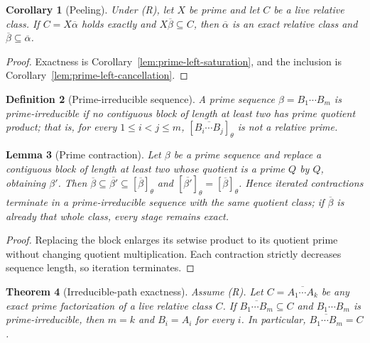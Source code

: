 \documentclass[11pt,a4paper]{article}
\newtheorem{theorem}{Theorem}[section]
\newtheorem{lemma}[theorem]{Lemma}
\newtheorem{corollary}[theorem]{Corollary}
\newtheorem{definition}[theorem]{Definition}
\begin{document}
\begin{corollary}[Peeling]
\label{cor:peeling}
Under \textup{(R)}, let $X$ be prime and let $C$ be a live relative class.  If $C=X\overline\alpha$ holds exactly and $X\overline\beta\subseteq C$, then $\overline\alpha$ is an exact relative class and $\overline\beta\subseteq\overline\alpha$.
\end{corollary}

\begin{proof}
Exactness is Corollary~\ref{lem:prime-left-saturation}, and the inclusion is Corollary~\ref{lem:prime-left-cancellation}.
\end{proof}

\begin{definition}[Prime-irreducible sequence]
A prime sequence $\beta=B_1\cdots B_m$ is \emph{prime-irreducible} if
no contiguous block of length at least two has prime quotient product;
that is, for every $1\le i<j\le m$,
$[\overline{B_i\cdots B_j}]_\theta$ is not a relative prime.
\end{definition}

\begin{lemma}[Prime contraction]
\label{lem:prime-contraction}
Let $\beta$ be a prime sequence and replace a contiguous block of length at least two whose quotient is a prime $Q$ by $Q$, obtaining $\beta'$.  Then $\overline\beta\subseteq\overline{\beta'}\subseteq[\overline\beta]_\theta$ and $[\overline{\beta'}]_\theta=[\overline\beta]_\theta$.  Hence iterated contractions terminate in a prime-irreducible sequence with the same quotient class; if $\overline\beta$ is already that whole class, every stage remains exact.
\end{lemma}

\begin{proof}
Replacing the block enlarges its setwise product to its quotient prime without changing quotient multiplication.  Each contraction strictly decreases sequence length, so iteration terminates.
\end{proof}

\begin{theorem}[Irreducible-path exactness]
\label{thm:irreducible-path}
Assume \textup{(R)}.  Let \(C=\overline{A_1\cdots A_k}\) be any exact prime
factorization of a live relative class $C$.  If
$\overline{B_1\cdots B_m}\subseteq C$ and $B_1\cdots B_m$ is
prime-irreducible, then $m=k$ and $B_i=A_i$ for every $i$.  In
particular, $\overline{B_1\cdots B_m}=C$.
\end{theorem}
\end{document}
